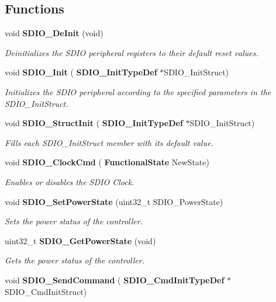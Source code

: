 \subsection*{Functions}
\begin{DoxyCompactItemize}
\item 
void \textbf{ S\+D\+I\+O\+\_\+\+De\+Init} (void)
\begin{DoxyCompactList}\small\item\em Deinitializes the S\+D\+IO peripheral registers to their default reset values. \end{DoxyCompactList}\item 
void \textbf{ S\+D\+I\+O\+\_\+\+Init} (\textbf{ S\+D\+I\+O\+\_\+\+Init\+Type\+Def} $\ast$S\+D\+I\+O\+\_\+\+Init\+Struct)
\begin{DoxyCompactList}\small\item\em Initializes the S\+D\+IO peripheral according to the specified parameters in the S\+D\+I\+O\+\_\+\+Init\+Struct. \end{DoxyCompactList}\item 
void \textbf{ S\+D\+I\+O\+\_\+\+Struct\+Init} (\textbf{ S\+D\+I\+O\+\_\+\+Init\+Type\+Def} $\ast$S\+D\+I\+O\+\_\+\+Init\+Struct)
\begin{DoxyCompactList}\small\item\em Fills each S\+D\+I\+O\+\_\+\+Init\+Struct member with its default value. \end{DoxyCompactList}\item 
void \textbf{ S\+D\+I\+O\+\_\+\+Clock\+Cmd} (\textbf{ Functional\+State} New\+State)
\begin{DoxyCompactList}\small\item\em Enables or disables the S\+D\+IO Clock. \end{DoxyCompactList}\item 
void \textbf{ S\+D\+I\+O\+\_\+\+Set\+Power\+State} (uint32\+\_\+t S\+D\+I\+O\+\_\+\+Power\+State)
\begin{DoxyCompactList}\small\item\em Sets the power status of the controller. \end{DoxyCompactList}\item 
uint32\+\_\+t \textbf{ S\+D\+I\+O\+\_\+\+Get\+Power\+State} (void)
\begin{DoxyCompactList}\small\item\em Gets the power status of the controller. \end{DoxyCompactList}\item 
void \textbf{ S\+D\+I\+O\+\_\+\+Send\+Command} (\textbf{ S\+D\+I\+O\+\_\+\+Cmd\+Init\+Type\+Def} $\ast$S\+D\+I\+O\+\_\+\+Cmd\+Init\+Struct)

\end{DoxyCompactItemize}
